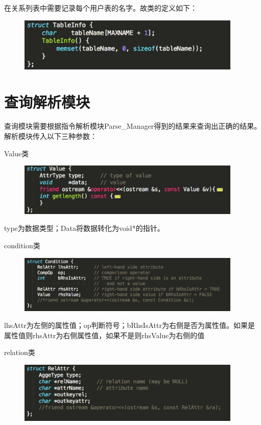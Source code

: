 在关系列表中需要记录每个用户表的名字。故类的定义如下：
\begin{figure}[H]
\centering
\includegraphics[width=4.2in]{Figures/TableInfo.jpg}
\end{figure}

\section{查询解析模块}

查询模块需要根据指令解析模块Parse\_Manager得到的结果来查询出正确的结果。解析模块传入以下三种参数：

Value类
\begin{figure}[H]
\centering
\includegraphics[width=4.2in]{Figures/Value.jpg}
\end{figure}

type为数据类型；Data将数据转化为void*的指针。

condition类
\begin{figure}[H]
\centering
\includegraphics[width=4.2in]{Figures/Condition.jpg}
\end{figure}
lhsAttr为左侧的属性值；op判断符号；bRhsIsAttr为右侧是否为属性值。如果是属性值则rhsAttr为右侧属性值，如果不是则rhsValue为右侧的值

relation类
\begin{figure}[H]
\centering
\includegraphics[width=4.2in]{Figures/relAttr.jpg}
\end{figure}

